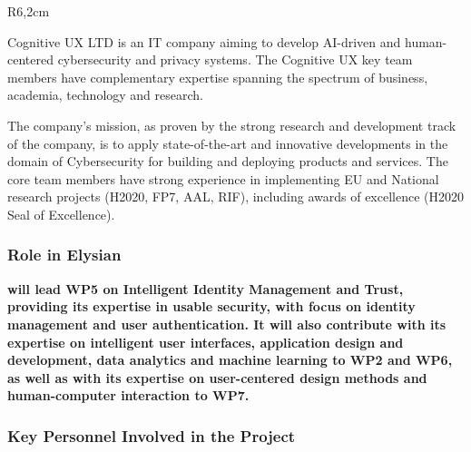\documentclass[a4paper,11pt]{article}
\begin{document}

\begin{wrapfigure}{R}{6,2cm}
\vspace{-3cm}
\hfill {}
\vspace{-1cm}
\end{wrapfigure}
\vspace{10pt}

Cognitive UX LTD is an IT company aiming to develop AI-driven and human-centered cybersecurity and privacy systems. The Cognitive UX key team members have complementary expertise spanning the spectrum of business, academia, technology and research. 

The company’s mission, as proven by the strong research and development track of the company, is to apply state-of-the-art and innovative developments in the domain of Cybersecurity for building and deploying products and services. The core team members have strong experience in implementing EU and National research projects (H2020, FP7, AAL, RIF), including awards of excellence (H2020 Seal of Excellence).

\subsubsection*{Role in Elysian}
\textbf{\COGNIshort{} will lead WP5 on Intelligent Identity Management and Trust, providing its expertise in usable security, with focus on identity management and user authentication. It will also contribute with its expertise on intelligent user interfaces, application design and development, data analytics and machine learning to WP2 and WP6, as well as with its expertise on user-centered design methods and human-computer interaction to WP7.}

\subsubsection*{Key Personnel Involved in the Project}
\end{document}

